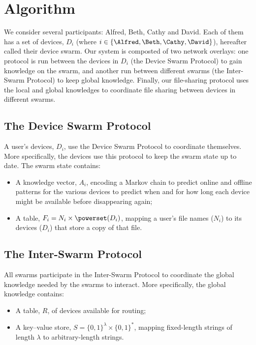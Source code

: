 \section{Algorithm}%
\label{Algorithm}


We consider several participants: Alfred, Beth, Cathy and David.
Each of them has a set of devices, \(D_i\) (where \(i\in \{\Alfred, \Beth, \Cathy, 
  \David\}\)), hereafter called their device swarm.
Our system is composted of two network overlays: one protocol is run between the 
devices in \(D_i\) (the Device Swarm Protocol) to gain knowledge on the 
swarm, and another run between different swarms (the Inter-Swarm Protocol) to 
keep global knowledge.
Finally, our file-sharing protocol uses the local and global 
knowledges to coordinate file sharing between devices in different swarms.

\subsection{The Device Swarm Protocol}%
\label{DeviceSwarmProtocol}

A user's devices, \(D_i\), use the Device Swarm Protocol to coordinate 
themselves.
More specifically, the devices use this protocol to keep the swarm state up to 
date.
The swarm state contains:
\begin{itemize}
  \item A knowledge vector, \(A_i\), encoding a Markov chain to predict online 
    and offline patterns for the various devices to predict when and for how 
    long each device might be available before disappearing again;
  \item A table, \(F_i = N_i\times \powerset(D_i)\), mapping a user's file names 
    (\(N_i\)) to its devices (\(D_i\)) that store a copy of that file.
\end{itemize}


\subsection{The Inter-Swarm Protocol}%
\label{InterSwarmProtocol}

All swarms participate in the Inter-Swarm Protocol to coordinate the global 
knowledge needed by the swarms to interact.
More specifically, the global knowledge contains:
\begin{itemize}
  \item A table, \(R\), of devices available for routing;
  \item A key--value store, \(S = \{0, 1\}^\lambda\times \{0, 1\}^*\), mapping 
    fixed-length strings of length \(\lambda\) to arbitrary-length strings.
\end{itemize}

